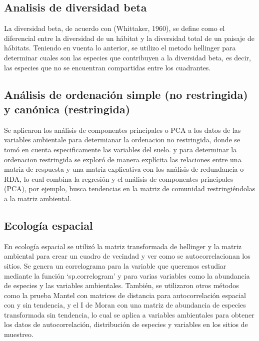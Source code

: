 \documentclass[11pt,]{article}
\begin{document}
\subsection{Analisis de diversidad
beta}\label{analisis-de-diversidad-beta}

La diversidad beta, de acuerdo con (Whittaker, 1960), se define como el
diferencial entre la diversidad de un hábitat y la diversidad total de
un paisaje de hábitats. Teniendo en vuenta lo anterior, se utilizo el
metodo hellinger para determinar cuales son las especies que contribuyen
a la diversidad beta, es decir, las especies que no se encuentran
compartidas entre los cuadrantes.

\subsection{Análisis de ordenación simple (no restringida) y canónica
(restringida)}\label{anuxe1lisis-de-ordenaciuxf3n-simple-no-restringida-y-canuxf3nica-restringida}

Se aplicaron los análisis de componentes principales o PCA a los datos
de las variables ambientale para determianar la ordenacion no
restringida, donde se tomó en cuenta especificamente las variables del
suelo. y para determinar la ordenacion restringida se exploró de manera
explícita las relaciones entre una matriz de respuesta y una matriz
explicativa con los análisis de redundancia o RDA, lo cual combina la
regresión y el análisis de componentes principales (PCA), por ejemplo,
busca tendencias en la matriz de comunidad restringiéndolas a la matriz
ambiental.

\subsection{Ecología espacial}\label{ecologuxeda-espacial}

En ecología espacial se utilizó la matriz transformada de hellinger y la
matriz ambiental para crear un cuadro de vecindad y ver como se
autocorrelacionan los sitios. Se genera un correlograma para la variable
que queremos estudiar mediante la función `sp.correlogram' y para varias
variables como la abundancia de especies y las variables ambientales.
También, se utilizaron otros métodos como la prueba Mantel con matrices
de distancia para autocorrelación espacial con y sin tendencia, y el I
de Moran con una matriz de abundancia de especies transformada sin
tendencia, lo cual se aplica a variables ambientales para obtener los
datos de autocorrelación, distribución de especies y variables en los
sitios de muestreo.
\end{document}
